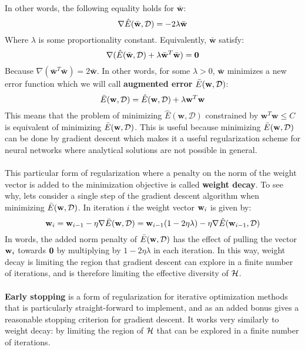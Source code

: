 In other words, the following equality holds for $\bar{\mathbf{w}}$:
$$
\nabla \hat{E}(\bar{\mathbf{w}}, \mathcal{D}) = -2\lambda\bar{\mathbf{w}}
$$
Where $\lambda$ is some proportionality constant. Equivalently, $\bar{\mathbf{w}}$ satisfy:
$$
\nabla (\hat{E}(\bar{\mathbf{w}}, \mathcal{D}) + \lambda\bar{\mathbf{w}}^T\bar{\mathbf{w}}) = \mathbf{0}
$$
Because $\nabla(\bar{\mathbf{w}}^T\bar{\mathbf{w}}) = 2\bar{\mathbf{w}}$. In other words, for some $\lambda > 0$, $\bar{\mathbf{w}}$ minimizes a new error function which we will call \textbf{augmented error} $\bar{E}(\mathbf{w}, \mathcal{D})$:
$$
\bar{E}(\mathbf{w}, \mathcal{D}) = \hat{E}(\mathbf{w}, \mathcal{D}) + \lambda\mathbf{w}^T\mathbf{w}
$$
This means that the problem of minimizing $\hat{E}(\mathbf{w}, \mathcal{D})$ constrained by $\mathbf{w}^T\mathbf{w} \leq C$ is equivalent of minimizing $\bar{E}(\mathbf{w}, \mathcal{D})$. This is useful because minimizing $\bar{E}(\mathbf{w}, \mathcal{D})$ can be done by gradient descent which makes it a useful regularization scheme for neural networks where analytical solutions are not possible in general.
\\\\
This particular form of regularization where a penalty on the norm of the weight vector is added to the minimization objective is called \textbf{weight decay}. To see why, lets consider a single step of the gradient descent algorithm when minimizing $\bar{E}(\mathbf{w}, \mathcal{D})$. In iteration $i$ the weight vector $\mathbf{w}_i$ is given by:
$$
\mathbf{w}_i = \mathbf{w}_{i-1} - \eta \nabla \bar{E}(\mathbf{w}, \mathcal{D}) = \mathbf{w}_{i-1}(1 - 2\eta\lambda) - \eta \nabla \hat{E}(\mathbf{w}_{i-1}, \mathcal{D})	
$$
In words, the added norm penalty of $\bar{E}(\mathbf{w}, \mathcal{D})$ has the effect of pulling the vector $\mathbf{w}_i$ towards $\mathbf{0}$ by multiplying by $1 - 2\eta\lambda$ in each iteration. In this way, weight decay is limiting the region that gradient descent can explore in a finite number of iterations, and is therefore limiting the effective diversity of $\mathcal{H}$.
\\\\
\textbf{Early stopping} is a form of regularization for iterative optimization methods that is particularly straight-forward to implement, and as an added bonus gives a reasonable stopping criterion for gradient descent. It works very similarly to weight decay: by limiting the region of $\mathcal{H}$ that can be explored in a finite number of iterations.

